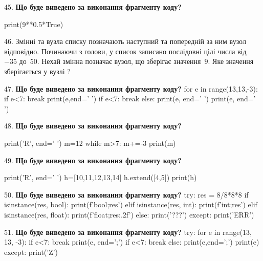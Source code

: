 \documentclass[11pt]{article}
\begin{document}
45. \textbf{Що буде виведено за виконання фрагменту коду?}

print(9**0.5*True)
\par\vspace{5mm}

46. 
Змінні  та  вузла списку позначають наступний та попередній за ним вузол відповідно. Починаючи з голови, у список записано послідовні цілі числа від~$-35$ до~$50$. Нехай змінна  позначає вузол, що зберігає значення~$9$.
Яке значення зберігається у вузлі  ?
\par\vspace{5mm}

47. \textbf{Що буде виведено за виконання фрагменту коду?}
for e in range(13,13,-3):
    if e<7:
        break
        print(e,end=' ')
    if e<7:
        break
else:
    print(e, end=' ')
print(e, end=' ')
\par\vspace{5mm}

48. \textbf{Що буде виведено за виконання фрагменту коду?}

print('R', end=' ')
m=12
while m>7:
    m+=-3
print(m)

\par\vspace{5mm}

49. \textbf{Що буде виведено за виконання фрагменту коду?}

print('R', end=' ')
h=[10,11,12,13,14]
h.extend([4,5])
print(h)

\par\vspace{5mm}

50. \textbf{Що буде виведено за виконання фрагменту коду?}
try:
    res = 8/8*8*8
    if isinstance(res, bool):
        print(f'bool;{res}')
    elif isinstance(res, int):
        print(f'int;{res}')
    elif isinstance(res, float):
        print(f'float;{res:.2f}')
    else:
        print('???')
except:
    print('ERR')
\par\vspace{5mm}

51. \textbf{Що буде виведено за виконання фрагменту коду?}
try:
    for e in range(13, 13, -3):
        if e<7:
            break
        print(e, end=';')
        if e<7:
            break
    else:
        print(e,end=';')
    print(e)
except:
    print('Z')
\par\vspace{5mm}
\end{document}

